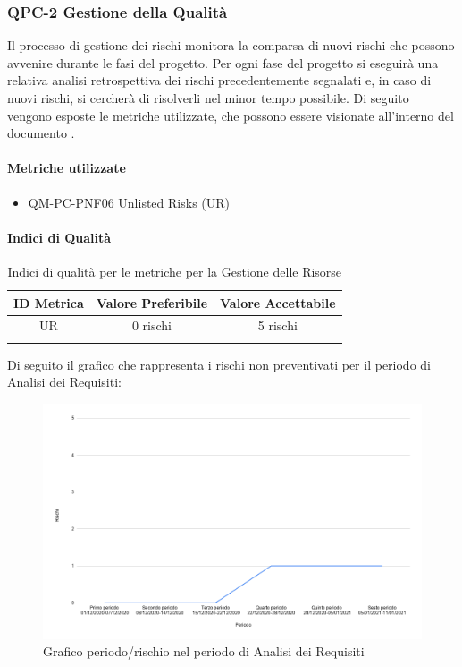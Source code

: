 			
			
			
			
			
			
			
			
	
	
	
	
	
	
	
	\subsubsection{QPC-2 Gestione della Qualità}

		Il processo di gestione dei rischi monitora la comparsa di nuovi rischi che possono avvenire durante le fasi del progetto.
		Per ogni fase del progetto si eseguirà una relativa analisi retrospettiva dei rischi precedentemente segnalati e, in caso di nuovi rischi, si cercherà di risolverli nel minor tempo possibile.
		Di seguito vengono esposte le metriche utilizzate, che possono essere visionate all'interno del documento .

		\paragraph{Metriche utilizzate}
			\begin{itemize}
				\item QM-PC-PNF06 Unlisted Risks (UR)
			\end{itemize}
			
		\paragraph{Indici di Qualità}
			\begin{center}
				\begin{longtable}{|c|c|c|}
				\hline
				\rowcolor{lighter-grayer}
				\textbf{ID Metrica} & \textbf{Valore Preferibile} & \textbf{Valore Accettabile}\\
				\hline
				\endfirsthead
				\hline
				UR & 0 rischi & 5 rischi \\
				\hline
				\caption{Indici di qualità per le metriche per la Gestione delle Risorse}
				\end{longtable}
			\end{center}

			
			Di seguito il grafico che rappresenta i rischi non preventivati per il periodo di Analisi dei Requisiti:
			
			\begin{figure}[H]
				\centering
				\includegraphics[width=0.9\linewidth]{./res/images/rischi.png}
				\caption{Grafico periodo/rischio nel periodo di Analisi dei Requisiti}
				\label{fig:Grafico rischi periodo di Analisi dei Requisiti}
			\end{figure}


